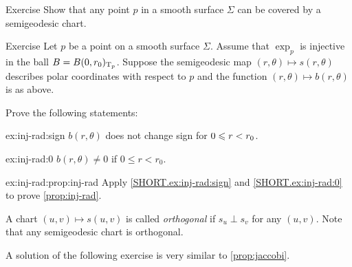 \begin{thm}{Exercise}\label{ex:semigeodesc-chart}
Show that any point $p$ in a smooth surface $\Sigma$ can be covered by a semigeodesic chart.
\end{thm}

\begin{thm}{Exercise}\label{ex:inj-rad}
Let $p$ be a point on a smooth surface $\Sigma$.
Assume that $\exp_p$ is injective in the ball $B=B(0,r_0)_{\mathrm{T}_p}$.
Suppose the semigeodesic map $(r,\theta)\mapsto s(r,\theta)$ describes polar coordinates with respect to $p$ and the function $(r,\theta)\mapsto b(r,\theta)$ is as above.

Prove the following statements:

\begin{subthm}{ex:inj-rad:sign}
$b(r,\theta)$ does not change sign for $0\z\le r\z<r_0$.
\end{subthm}

\begin{subthm}{ex:inj-rad:0}
$b(r,\theta)\ne0$ if $0\le r<r_0$.
\end{subthm}

\begin{subthm}{ex:inj-rad:prop:inj-rad}
Apply \ref{SHORT.ex:inj-rad:sign} and \ref{SHORT.ex:inj-rad:0} to prove \ref{prop:inj-rad}.
\end{subthm}
 
\end{thm}



A chart $(u,v)\mapsto s(u,v)$ is called \emph{orthogonal} if $s_u\perp s_v$ for any $(u,v)$.
Note that any semigeodesic chart is orthogonal.

A solution of the following exercise is very similar to \ref{prop:jaccobi}.

